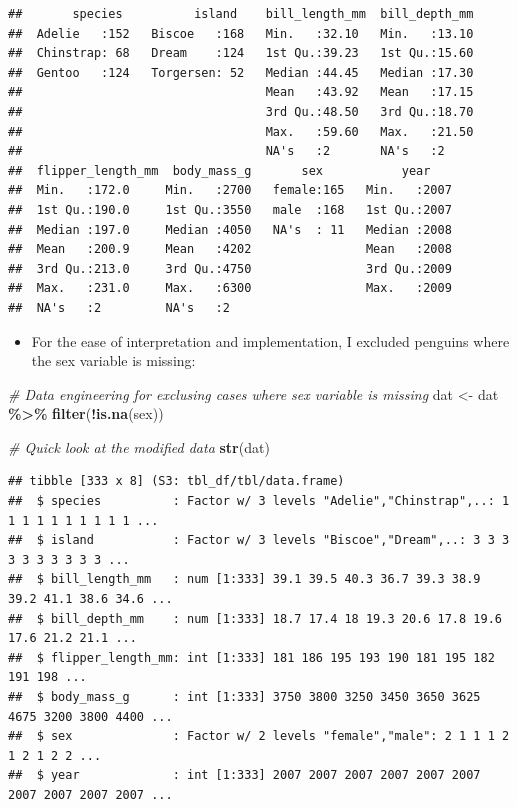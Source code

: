 \documentclass[
]{book}
\newenvironment{Shaded}{\begin{snugshade}}{\end{snugshade}}
\newcommand{\CommentTok}[1]{\textcolor[rgb]{0.56,0.35,0.01}{\textit{#1}}}
\newcommand{\FunctionTok}[1]{\textcolor[rgb]{0.13,0.29,0.53}{\textbf{#1}}}
\newcommand{\NormalTok}[1]{#1}
\newcommand{\OtherTok}[1]{\textcolor[rgb]{0.56,0.35,0.01}{#1}}
\newcommand{\SpecialCharTok}[1]{\textcolor[rgb]{0.81,0.36,0.00}{\textbf{#1}}}
\providecommand{\tightlist}{%
  \setlength{\itemsep}{0pt}\setlength{\parskip}{0pt}}
\begin{document}
\begin{verbatim}
##       species          island    bill_length_mm  bill_depth_mm  
##  Adelie   :152   Biscoe   :168   Min.   :32.10   Min.   :13.10  
##  Chinstrap: 68   Dream    :124   1st Qu.:39.23   1st Qu.:15.60  
##  Gentoo   :124   Torgersen: 52   Median :44.45   Median :17.30  
##                                  Mean   :43.92   Mean   :17.15  
##                                  3rd Qu.:48.50   3rd Qu.:18.70  
##                                  Max.   :59.60   Max.   :21.50  
##                                  NA's   :2       NA's   :2      
##  flipper_length_mm  body_mass_g       sex           year     
##  Min.   :172.0     Min.   :2700   female:165   Min.   :2007  
##  1st Qu.:190.0     1st Qu.:3550   male  :168   1st Qu.:2007  
##  Median :197.0     Median :4050   NA's  : 11   Median :2008  
##  Mean   :200.9     Mean   :4202                Mean   :2008  
##  3rd Qu.:213.0     3rd Qu.:4750                3rd Qu.:2009  
##  Max.   :231.0     Max.   :6300                Max.   :2009  
##  NA's   :2         NA's   :2
\end{verbatim}

\begin{itemize}
\tightlist
\item
  For the ease of interpretation and implementation, I excluded penguins where the sex variable is missing:
\end{itemize}

\begin{Shaded}
\begin{Highlighting}[]
\CommentTok{\# Data engineering for exclusing cases where sex variable is missing}
\NormalTok{dat }\OtherTok{\textless{}{-}}\NormalTok{ dat }\SpecialCharTok{\%\textgreater{}\%} \FunctionTok{filter}\NormalTok{(}\SpecialCharTok{!}\FunctionTok{is.na}\NormalTok{(sex))}

\CommentTok{\# Quick look at the modified data}
\FunctionTok{str}\NormalTok{(dat)}
\end{Highlighting}
\end{Shaded}

\begin{verbatim}
## tibble [333 x 8] (S3: tbl_df/tbl/data.frame)
##  $ species          : Factor w/ 3 levels "Adelie","Chinstrap",..: 1 1 1 1 1 1 1 1 1 1 ...
##  $ island           : Factor w/ 3 levels "Biscoe","Dream",..: 3 3 3 3 3 3 3 3 3 3 ...
##  $ bill_length_mm   : num [1:333] 39.1 39.5 40.3 36.7 39.3 38.9 39.2 41.1 38.6 34.6 ...
##  $ bill_depth_mm    : num [1:333] 18.7 17.4 18 19.3 20.6 17.8 19.6 17.6 21.2 21.1 ...
##  $ flipper_length_mm: int [1:333] 181 186 195 193 190 181 195 182 191 198 ...
##  $ body_mass_g      : int [1:333] 3750 3800 3250 3450 3650 3625 4675 3200 3800 4400 ...
##  $ sex              : Factor w/ 2 levels "female","male": 2 1 1 1 2 1 2 1 2 2 ...
##  $ year             : int [1:333] 2007 2007 2007 2007 2007 2007 2007 2007 2007 2007 ...
\end{verbatim}
\end{document}
